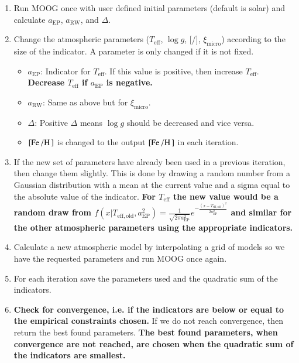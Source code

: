 \documentclass{aa}
\begin{document}
\begin{enumerate}
    \item Run MOOG once with user defined initial parameters (default is
          solar) and calculate $a_\mathrm{EP}$, $a_\mathrm{RW}$, and
          $\Delta$.
    \item Change the atmospheric parameters ($T_\mathrm{eff}$, $\log g$,
          [/], $\xi_\mathrm{micro}$) according to the size of the
          indicator. A parameter is only changed if it is not fixed.
    \begin{itemize}
        \item $a_\mathrm{EP}$: Indicator for $T_\mathrm{eff}$. If this value
              is positive, then increase $T_\mathrm{eff}$. {\bf Decrease $T_\mathrm{eff}$
              if $a_\mathrm{EP}$ is negative.}
        \item $a_\mathrm{RW}$: Same as above but for $\xi_\mathrm{micro}$.
        \item $\Delta$: Positive $\Delta$ means $\log g$
              should be decreased and vice versa.
        \item $[\ion{Fe}{}/\ion{H}{}]$ is changed to the output
              $[\ion{Fe}{}/\ion{H}{}]$ in each iteration.
    \end{itemize}
    \item If the new set of parameters have already been used in a previous
          iteration, then change them slightly. This is done by drawing a random
          number from a Gaussian distribution with a mean at the current value
          and a sigma equal to the absolute value of the indicator. {\bf For $T_\mathrm{eff}$
          the new value would be a random draw from
          $f(x|T_\mathrm{eff,old},a_\mathrm{EP}^2) = \frac{1}{\sqrt{2\pi a_\mathrm{EP}^2 }}e^{-\frac{(x - T_\mathrm{eff,old})^2 } {2 a_\mathrm{EP}^2} }$
          and similar for the other atmospheric parameters using the appropriate
          indicators.}
    \item Calculate a new atmospheric model by interpolating a grid of models
          so we have the requested parameters and run MOOG once again.
    \item For each iteration save the parameters used and the quadratic sum of
          the indicators.
    \item {\bf Check for convergence, i.e. if the indicators are below or equal
          to the empirical constraints chosen.} If we do not reach convergence,
          then return the best found parameters. {\bf The best found parameters,
          when convergence are not reached, are chosen when the quadratic sum
          of the indicators are smallest.}
\end{enumerate}
\end{document}
